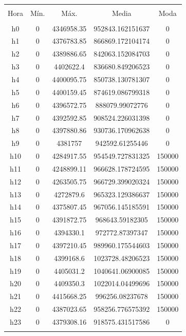 \documentclass[conference, 10pt]{IEEEtran}
\begin{document}
\begin{table}[!htbp] \centering 
  \caption{} 
  \label{} 
\begin{tabular}{@{\extracolsep{5pt}} ccccc} 
\\[-1.8ex]\hline 
\hline \\[-1.8ex] 
Hora & Mín. & Máx. & Media & Moda \\ 
\hline \\[-1.8ex] 
h0 & 0 & 4346958.35 & 952843.162151637 & 0 \\ 
h1 & 0 & 4376783.85 & 866869.172104174 & 0 \\ 
h2 & 0 & 4389886.65 & 842063.152084703 & 0 \\ 
h3 & 0 & 4402622.4 & 836680.849206523 & 0 \\ 
h4 & 0 & 4400095.75 & 850738.130781307 & 0 \\ 
h5 & 0 & 4400159.45 & 874619.086799318 & 0 \\ 
h6 & 0 & 4396572.75 & 888079.99072776 & 0 \\ 
h7 & 0 & 4392592.85 & 908524.226031398 & 0 \\ 
h8 & 0 & 4397880.86 & 930736.170962638 & 0 \\ 
h9 & 0 & 4381757 & 942592.61255446 & 0 \\ 
h10 & 0 & 4284917.55 & 954549.727831325 & 150000 \\ 
h11 & 0 & 4248899.11 & 966628.178724595 & 150000 \\ 
h12 & 0 & 4263505.75 & 966729.399020324 & 150000 \\ 
h13 & 0 & 4272879.6 & 965323.129386637 & 150000 \\ 
h14 & 0 & 4375807.45 & 967056.145185591 & 150000 \\ 
h15 & 0 & 4391872.75 & 968643.59182305 & 150000 \\ 
h16 & 0 & 4394330.1 & 972772.87397347 & 150000 \\ 
h17 & 0 & 4397210.45 & 989960.175544603 & 150000 \\ 
h18 & 0 & 4399168.6 & 1023728.48206523 & 150000 \\ 
h19 & 0 & 4405031.2 & 1040641.06900085 & 150000 \\ 
h20 & 0 & 4409350.3 & 1022014.04499696 & 150000 \\ 
h21 & 0 & 4415668.25 & 996256.08237678 & 150000 \\ 
h22 & 0 & 4387023.65 & 958256.776575392 & 150000 \\ 
h23 & 0 & 4379308.16 & 918575.431517586 & 0 \\ 
\hline \\[-1.8ex] 
\end{tabular} 
\end{table}
\end{document}
